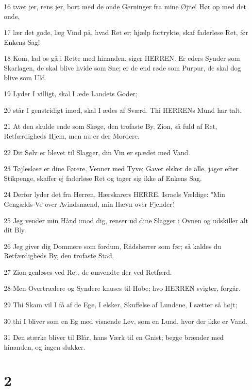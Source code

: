 \par 16 tvæt jer, rens jer, bort med de onde Gerninger fra mine Øjne! Hør op med det onde,
\par 17 lær det gode, læg Vind på, hvad Ret er; hjælp fortrykte, skaf faderløse Ret, før Enkens Sag!
\par 18 Kom, lad os gå i Rette med hinanden, siger HERREN. Er eders Synder som Skarlagen, de skal blive hvide som Sne; er de end røde som Purpur, de skal dog blive som Uld.
\par 19 Lyder I villigt, skal I æde Landets Goder;
\par 20 står I genstridigt imod, skal I ædes af Sværd. Thi HERRENs Mund har talt.
\par 21 At den skulde ende som Skøge, den trofaste By, Zion, så fuld af Ret, Retfærdigheds Hjem, men nu er der Mordere.
\par 22 Dit Sølv er blevet til Slagger, din Vin er spædet med Vand.
\par 23 Tøjlesløse er dine Førere, Venner med Tyve; Gaver elsker de alle, jager efter Stikpenge, skaffer ej faderløse Ret og tager sig ikke af Enkens Sag.
\par 24 Derfor lyder det fra Herren, Hærskarers HERRE, Israels Vældige: "Min Gengælds Ve over Avindsmænd, min Hævn over Fjender!
\par 25 Jeg vender min Hånd imod dig, renser ud dine Slagger i Ovnen og udskiller alt dit Bly.
\par 26 Jeg giver dig Dommere som fordum, Rådsherrer som før; så kaldes du Retfærdigheds By, den trofaste Stad.
\par 27 Zion genløses ved Ret, de omvendte der ved Retfærd.
\par 28 Men Overtrædere og Syndere knuses til Hobe; hvo HERREN svigter, forgår.
\par 29 Thi Skam vil I få af de Ege, I elsker, Skuffelse af Lundene, I sætter så højt;
\par 30 thi I bliver som en Eg med visnende Løv, som en Lund, hvor der ikke er Vand.
\par 31 Den stærke bliver til Blår, hans Værk til en Gnist; begge brænder med hinanden, og ingen slukker.

\chapter{2}

